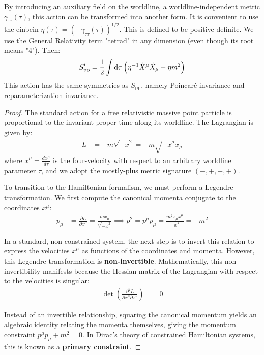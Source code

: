 By introducing an auxiliary field on the worldline, a worldline-independent metric $\gamma_{\tau\tau}(\tau)$, this action can be transformed into another form. It is convenient to use the einbein $\eta(\tau)=(-\gamma_{\tau\tau}(\tau))^{1/2}$. This is defined to be positive-definite. We use the General Relativity term "tetrad" in any dimension (even though its root means "4"). Then: 
\begin{equation}
	S^\prime _{\mathrm{pp}}=\frac{1}{2}\int \mathrm{d}\tau\: \Bigl(\eta^{-1}\dot{X}^\mu \dot{X}_\mu-\eta m^2\Bigr) \label{action-reparameter}
\end{equation}
This action has the same symmetries as $S_{\mathrm{pp}}$, namely Poincaré invariance and reparameterization invariance. 
\begin{tcolorbox}[breakable]
	\begin{proof}
		The standard action for a free relativistic massive point particle is proportional to the invariant proper time along its worldline. The Lagrangian is given by:
		\begin{align*}
			L &= -m\sqrt{-\dot{x}^2} = -m\sqrt{-\dot{x}^\mu \dot{x}_\mu}
		\end{align*}
		where $\dot{x}^\mu = \frac{dx^\mu}{d\tau}$ is the four-velocity with respect to an arbitrary worldline parameter $\tau$, and we adopt the mostly-plus metric signature $(-, +, +, +)$.
		
		To transition to the Hamiltonian formalism, we must perform a Legendre transformation. We first compute the canonical momenta conjugate to the coordinates $x^\mu$:
		\begin{align*}
			p_\mu &= \frac{\partial L}{\partial \dot{x}^\mu} = \frac{m\dot{x}_\mu}{\sqrt{-\dot{x}^2}} \implies p^2 = p^\mu p_\mu = \frac{m^2 \dot{x}_\mu \dot{x}^\mu}{-\dot{x}^2} = -m^2
		\end{align*}
		
		In a standard, non-constrained system, the next step is to invert this relation to express the velocities $\dot{x}^\mu$ as functions of the coordinates and momenta. However, this Legendre transformation is \textbf{non-invertible}. Mathematically, this non-invertibility manifests because the Hessian matrix of the Lagrangian with respect to the velocities is singular:
		\begin{align*}
			\det \left( \frac{\partial^2 L}{\partial \dot{x}^\mu \partial \dot{x}^\nu} \right) &= 0
		\end{align*}
		
		Instead of an invertible relationship, squaring the canonical momentum yields an algebraic identity relating the momenta themselves, giving the momentum constraint $p^\mu p_\mu + m^2 = 0$. In Dirac's theory of constrained Hamiltonian systems, this is known as a \textbf{primary constraint}. 
		

\end{proof}
\end{tcolorbox}
